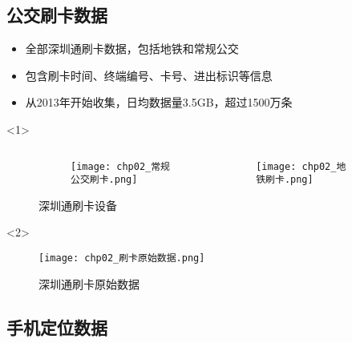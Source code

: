 \subsection{公交刷卡数据}

\begin{frame}[t]{\subsecname}
\begin{itemize}
\item<1-> 全部深圳通刷卡数据，包括地铁和常规公交
\item<1-> 包含刷卡时间、终端编号、卡号、进出标识等信息
\item<2-> 从2013年开始收集，日均数据量3.5GB，超过1500万条
\end{itemize}

\begin{overlayarea}{\textwidth}{\textheight}
  \begin{onlyenv}<1>
\begin{figure} \centering
\begin{columns}[b]
  \begin{column}{.5\textwidth}
    \begin{figure}\flushright
      \texttt{[image: chp02\_常规公交刷卡.png]}
    \end{figure}
  \end{column}
  \begin{column}{.5\textwidth}
    \begin{figure}\flushleft
      \texttt{[image: chp02\_地铁刷卡.png]}
    \end{figure}
  \end{column}
\end{columns}
\caption{深圳通刷卡设备} 
\end{figure}
  \end{onlyenv}

\vspace{-15pt}
  \begin{onlyenv}<2>
\begin{figure} \centering
    \texttt{[image: chp02\_刷卡原始数据.png]}
    \caption{深圳通刷卡原始数据} 
\end{figure}
  \end{onlyenv}
\end{overlayarea}
\end{frame}

\subsection{手机定位数据}
 
